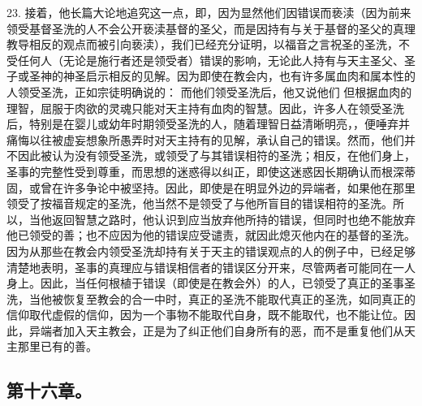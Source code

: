 23. 接着，他长篇大论地追究这一点，即，因为显然他们因错误而亵渎（因为前来领受基督圣洗的人不会公开亵渎基督的圣父，而是因持有与关于基督的圣父的真理教导相反的观点而被引向亵渎），我们已经充分证明，以福音之言祝圣的圣洗，不受任何人（无论是施行者还是领受者）错误的影响，无论此人持有与天主圣父、圣子或圣神的神圣启示相反的见解。因为即使在教会内，也有许多属血肉和属本性的人领受圣洗，正如宗徒明确说的： 而他们领受圣洗后，他又说他们 但根据血肉的理智，屈服于肉欲的灵魂只能对天主持有血肉的智慧。因此，许多人在领受圣洗后，特别是在婴儿或幼年时期领受圣洗的人，随着理智日益清晰明亮，，便唾弃并痛悔以往被虚妄想象所愚弄时对天主持有的见解，承认自己的错误。然而，他们并不因此被认为没有领受圣洗，或领受了与其错误相符的圣洗；相反，在他们身上，圣事的完整性受到尊重，而思想的迷惑得以纠正，即使这迷惑因长期确认而根深蒂固，或曾在许多争论中被坚持。因此，即使是在明显外边的异端者，如果他在那里领受了按福音规定的圣洗，他当然不是领受了与他所盲目的错误相符的圣洗。所以，当他返回智慧之路时，他认识到应当放弃他所持的错误，但同时也绝不能放弃他已领受的善；也不应因为他的错误应受谴责，就因此熄灭他内在的基督的圣洗。因为从那些在教会内领受圣洗却持有关于天主的错误观点的人的例子中，已经足够清楚地表明，圣事的真理应与错误相信者的错误区分开来，尽管两者可能同在一人身上。因此，当任何根植于错误（即使是在教会外）的人，已领受了真正的圣事圣洗，当他被恢复至教会的合一中时，真正的圣洗不能取代真正的圣洗，如同真正的信仰取代虚假的信仰，因为一个事物不能取代自身，既不能取代，也不能让位。因此，异端者加入天主教会，正是为了纠正他们自身所有的恶，而不是重复他们从天主那里已有的善。\par


\subsection{第十六章。}

